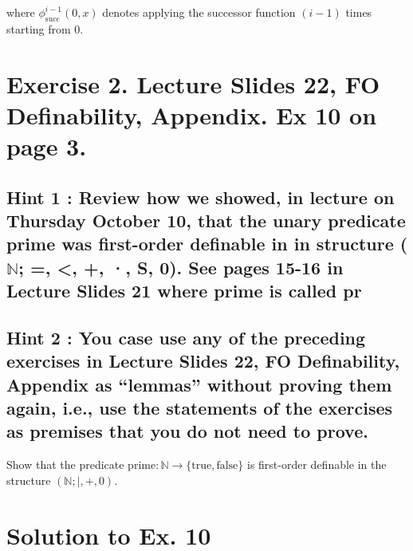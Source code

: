 \documentclass{article}
\begin{document}
where $\phi_{\text{succ}}^{i-1}(0, x)$ denotes applying the successor function $(i-1)$ times starting from 0.




\newpage

\section*{Exercise 2. Lecture Slides 22, FO Definability, Appendix. Ex 10 on page 3.}

\subsection*{Hint 1 : Review how we showed, in lecture on Thursday October 10, that the unary predicate prime
was first-order definable in in structure ($\mathbb{N}$; =, <, +, ·, S, 0). See pages 15-16 in Lecture Slides 21
where prime is called pr}

\subsection*{Hint 2 : You case use any of the preceding exercises in Lecture Slides 22, FO Definability,
Appendix as “lemmas” without proving them again, i.e., use the statements of the exercises as
premises that you do not need to prove.}

\begin{mdframed}
    Show that the predicate $\text{prime} : \mathbb{N} \to \{\text{true}, \text{false}\}$ is first-order definable in the structure $(\mathbb{N}; |, +, 0)$.
\end{mdframed}

\section*{Solution to Ex. 10}
\end{document}
